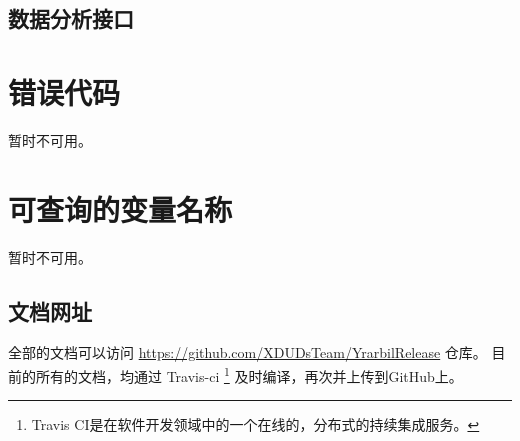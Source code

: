 \documentclass[UTF8]{article}
\begin{document}
        \subsection{数据分析接口}

		\section{错误代码}
        暂时不可用。
		\section{可查询的变量名称}
        暂时不可用。


    \newpage
    \begin{appendices}
    
    \section{文档网址}
         全部的文档可以访问 \url{https://github.com/XDUDsTeam/YrarbilRelease} 仓库。
      目前的所有的文档，均通过 Travis-ci
      \footnote{Travis CI是在软件开发领域中的一个在线的，分布式的持续集成服务。}
      及时编译，再次并上传到GitHub上。

    \end{appendices}
\end{document}
